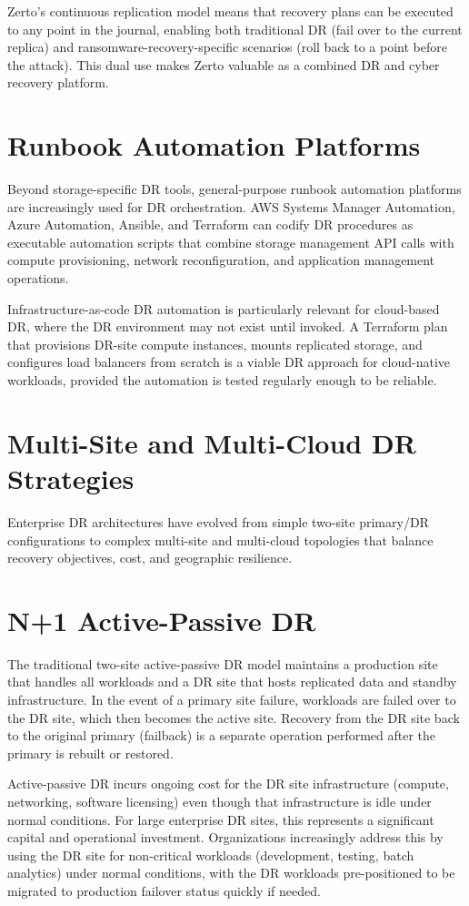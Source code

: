 Zerto's continuous replication model means that recovery plans can be executed to any point in the journal, enabling both traditional DR (fail over to the current replica) and ransomware-recovery-specific scenarios (roll back to a point before the attack). This dual use makes Zerto valuable as a combined DR and cyber recovery platform.

\section{Runbook Automation Platforms}
Beyond storage-specific DR tools, general-purpose runbook automation platforms are increasingly used for DR orchestration. AWS Systems Manager Automation, Azure Automation, Ansible, and Terraform can codify DR procedures as executable automation scripts that combine storage management API calls with compute provisioning, network reconfiguration, and application management operations.

Infrastructure-as-code DR automation is particularly relevant for cloud-based DR, where the DR environment may not exist until invoked. A Terraform plan that provisions DR-site compute instances, mounts replicated storage, and configures load balancers from scratch is a viable DR approach for cloud-native workloads, provided the automation is tested regularly enough to be reliable.

\section{Multi-Site and Multi-Cloud DR Strategies}
Enterprise DR architectures have evolved from simple two-site primary/DR configurations to complex multi-site and multi-cloud topologies that balance recovery objectives, cost, and geographic resilience.

\section{N+1 Active-Passive DR}
The traditional two-site active-passive DR model maintains a production site that handles all workloads and a DR site that hosts replicated data and standby infrastructure. In the event of a primary site failure, workloads are failed over to the DR site, which then becomes the active site. Recovery from the DR site back to the original primary (failback) is a separate operation performed after the primary is rebuilt or restored.

Active-passive DR incurs ongoing cost for the DR site infrastructure (compute, networking, software licensing) even though that infrastructure is idle under normal conditions. For large enterprise DR sites, this represents a significant capital and operational investment. Organizations increasingly address this by using the DR site for non-critical workloads (development, testing, batch analytics) under normal conditions, with the DR workloads pre-positioned to be migrated to production failover status quickly if needed.

